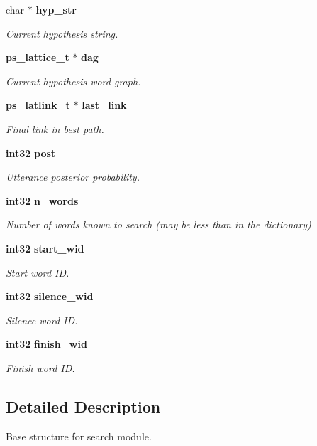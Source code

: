 \begin{DoxyCompactItemize}
char $\ast$ {\bf hyp\-\_\-str}
\begin{DoxyCompactList}\small\item\em \-Current hypothesis string. \end{DoxyCompactList}\item 
{\bf ps\-\_\-lattice\-\_\-t} $\ast$ {\bf dag}
\begin{DoxyCompactList}\small\item\em \-Current hypothesis word graph. \end{DoxyCompactList}\item 
{\bf ps\-\_\-latlink\-\_\-t} $\ast$ {\bf last\-\_\-link}
\begin{DoxyCompactList}\small\item\em \-Final link in best path. \end{DoxyCompactList}\item 
{\bf int32} {\bf post}
\begin{DoxyCompactList}\small\item\em \-Utterance posterior probability. \end{DoxyCompactList}\item 
{\bf int32} {\bf n\-\_\-words}\label{structps__search__s_ad4d98deb905bd664ec44313ea0065b1a}

\begin{DoxyCompactList}\small\item\em \-Number of words known to search (may be less than in the dictionary) \end{DoxyCompactList}\item 
{\bf int32} {\bf start\-\_\-wid}
\begin{DoxyCompactList}\small\item\em \-Start word \-I\-D. \end{DoxyCompactList}\item 
{\bf int32} {\bf silence\-\_\-wid}
\begin{DoxyCompactList}\small\item\em \-Silence word \-I\-D. \end{DoxyCompactList}\item 
{\bf int32} {\bf finish\-\_\-wid}
\begin{DoxyCompactList}\small\item\em \-Finish word \-I\-D. \end{DoxyCompactList}\end{DoxyCompactItemize}


\subsection{\-Detailed \-Description}
\-Base structure for search module. 

